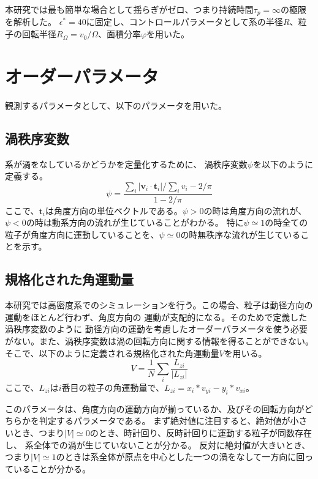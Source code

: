 \documentclass[/Users/ikedahajime/GitHub/reserch/master_report/thesis]{subfiles}
\begin{document}
本研究では最も簡単な場合として揺らぎがゼロ、つまり持続時間$\tau_p=\infty$の極限を解析した。
$\epsilon^*=40$に固定し、コントロールパラメータとして系の半径$R$、粒子の回転半径$R_\Omega=v_0/\Omega$、面積分率$\varphi$を用いた。


\section{オーダーパラメータ}
観測するパラメータとして、以下のパラメータを用いた。
\subsection{渦秩序変数}\label{subsec:vortes_order_parameter}
系が渦をなしているかどうかを定量化するために、
渦秩序変数$\psi$\cite{wiolandConfinementStabilizesBacterial2013}を以下のように定義する。
\begin{equation}\label{eq:def_psi}
    \psi=\frac{\sum_i \left|\bm{v}_i\cdot \bm{t}_i \right|/\sum_i v_i -2/\pi}{1-2/\pi}
\end{equation}
ここで、$\bm{t}_i$は角度方向の単位ベクトルである。$\psi>0$の時は角度方向の流れが、$\psi<0$の時は動系方向の流れが生じていることがわかる。
特に$\psi\simeq1$の時全ての粒子が角度方向に運動していることを、$\psi\simeq0$の時無秩序な流れが生じていることを示す。


\subsection{規格化された角運動量}
本研究では高密度系でのシミュレーションを行う。この場合、粒子は動径方向の運動をほとんど行わず、角度方向の
運動が支配的になる。そのためで定義した渦秩序変数のように
動径方向の運動を考慮したオーダーパラメータを使う必要がない。また、渦秩序変数は渦の回転方向に関する情報を得ることができない。
そこで、以下のように定義される規格化された角運動量$V$\cite{jiangEmergenceCollectiveDynamical2017,capriniCollectiveEffectsConfined2021}を用いる。
\begin{equation}
    V=\frac{1}{N} \sum_i \frac{L_{zi}}{ |L_{zi}|}
\end{equation}
ここで、$L_{zi}$は$i$番目の粒子の角運動量で、$L_{zi}=x_i*v_{yi}-y_i*v_{xi}$。


このパラメータは、角度方向の運動方向が揃っているか、及びその回転方向がどちらかを判定するパラメータである。
まず絶対値に注目すると、絶対値が小さいとき、つまり$|V|\simeq 0$のとき、時計回り、反時計回りに運動する粒子が同数存在し、
系全体での渦が生じていないことが分かる。
反対に絶対値が大きいとき、つまり$|V|\simeq 1$のときは系全体が原点を中心とした一つの渦をなして一方向に回っていることが分かる。
\end{document}
